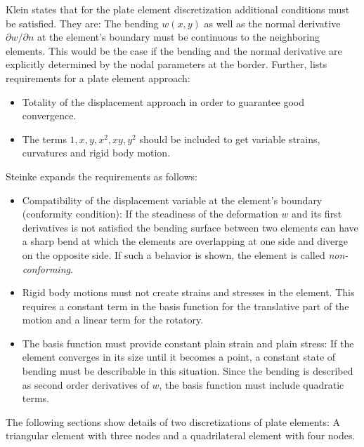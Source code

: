   Klein \cite{klein2013fem} states that for the plate element discretization additional conditions must be satisfied. They are: The bending $w(x,y)$ as well as the normal derivative $\partial w/\partial n$ at the element's boundary must be continuous to the neighboring elements. This would be the case if the bending and the normal derivative are explicitly determined by the nodal parameters at the border. Further, \cite{klein2013fem} lists requirements for a plate element approach:
  \begin{itemize}
  	\item Totality of the displacement approach in order to guarantee good convergence.
  	\item The terms $1, x, y, x^2, xy, y^2$ should be included to get variable strains, curvatures and rigid body motion.
  \end{itemize}
  Steinke \cite{steinke2005finite} expands the requirements as follows:
  \begin{itemize}
  	\item Compatibility of the displacement variable at the element's boundary (conformity condition): If the steadiness of the deformation $w$ and its first derivatives is not satisfied the bending surface between two elements can have a sharp bend at which the elements are overlapping at one side and diverge on the opposite side. If such a behavior is shown, the element is called \textit{non-conforming}.
  	\item Rigid body motions must not create strains and stresses in the element. This requires a constant term in the basis function for the translative part of the motion and a linear term for the rotatory.
  	\item The basis function must provide constant plain strain and plain stress: If the element converges in its size until it becomes a point, a constant state of bending must be describable in this situation. Since the bending is described as second order derivatives of $w$, the basis function must include quadratic terms.
  \end{itemize}
  The following sections show details of two discretizations of plate elements: A triangular element with three nodes and a quadrilateral element with four nodes.
  

